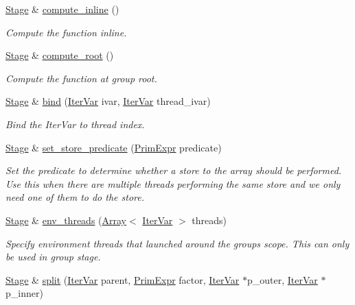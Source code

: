 \begin{DoxyCompactItemize}
\hyperlink{classtvm_1_1te_1_1Stage}{Stage} \& \hyperlink{classtvm_1_1te_1_1Stage_a1c58b35e37561739440b322c29d30c3b}{compute\+\_\+inline} ()
\begin{DoxyCompactList}\small\item\em Compute the function inline. \end{DoxyCompactList}\item 
\hyperlink{classtvm_1_1te_1_1Stage}{Stage} \& \hyperlink{classtvm_1_1te_1_1Stage_a95b58b2d2ec034ecd0bdb99f95c0b0ba}{compute\+\_\+root} ()
\begin{DoxyCompactList}\small\item\em Compute the function at group root. \end{DoxyCompactList}\item 
\hyperlink{classtvm_1_1te_1_1Stage}{Stage} \& \hyperlink{classtvm_1_1te_1_1Stage_aa9ace0034447b461610ebc1c2de69a26}{bind} (\hyperlink{classtvm_1_1tir_1_1IterVar}{Iter\+Var} ivar, \hyperlink{classtvm_1_1tir_1_1IterVar}{Iter\+Var} thread\+\_\+ivar)
\begin{DoxyCompactList}\small\item\em Bind the Iter\+Var to thread index. \end{DoxyCompactList}\item 
\hyperlink{classtvm_1_1te_1_1Stage}{Stage} \& \hyperlink{classtvm_1_1te_1_1Stage_a0056636228aed23f71eecc0810731436}{set\+\_\+store\+\_\+predicate} (\hyperlink{classtvm_1_1PrimExpr}{Prim\+Expr} predicate)
\begin{DoxyCompactList}\small\item\em Set the predicate to determine whether a store to the array should be performed. Use this when there are multiple threads performing the same store and we only need one of them to do the store. \end{DoxyCompactList}\item 
\hyperlink{classtvm_1_1te_1_1Stage}{Stage} \& \hyperlink{classtvm_1_1te_1_1Stage_aba3eb6be98bdb18da51a31bbf4af4617}{env\+\_\+threads} (\hyperlink{classtvm_1_1Array}{Array}$<$ \hyperlink{classtvm_1_1tir_1_1IterVar}{Iter\+Var} $>$ threads)
\begin{DoxyCompactList}\small\item\em Specify environment threads that launched around the group\textquotesingle{}s scope. This can only be used in group stage. \end{DoxyCompactList}\item 
\hyperlink{classtvm_1_1te_1_1Stage}{Stage} \& \hyperlink{classtvm_1_1te_1_1Stage_a5a7cd562be59b68a187ad97085a3425d}{split} (\hyperlink{classtvm_1_1tir_1_1IterVar}{Iter\+Var} parent, \hyperlink{classtvm_1_1PrimExpr}{Prim\+Expr} factor, \hyperlink{classtvm_1_1tir_1_1IterVar}{Iter\+Var} $\ast$p\+\_\+outer, \hyperlink{classtvm_1_1tir_1_1IterVar}{Iter\+Var} $\ast$p\+\_\+inner)

\end{DoxyCompactItemize}
